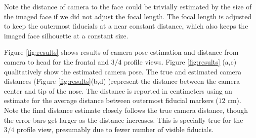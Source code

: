 \documentclass[runningheads]{llncs}
\begin{document}
Note the distance of camera to the face could be trivially estimated by the size of the imaged face if we did not adjust the focal length. 
The focal length is adjusted to keep the outermost fiducials at a near constant distance, which also keeps the imaged face silhouette at a constant size.

Figure \ref{fig:results} shows results of camera pose estimation and distance from camera to head for the frontal and $3/4$ profile views.  Figure \ref{fig:results} (a,c) qualitatively show the estimated camera pose.  The true and estimated camera distances (Figure \ref{fig:results}(b,d) )represent the distance between the camera center and tip of the nose.  The distance is reported in centimeters using an estimate for the average distance between outermost fiducial markers ($12$ cm). Note the final distance estimate closely follows the true camera distance, though the error bars get larger as the distance increases.  This is specially true for the $3/4$ profile view, presumably due to fewer number of visible fiducials.   
\end{document}
